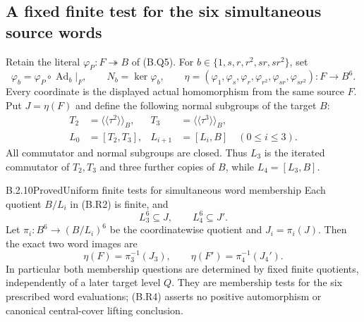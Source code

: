 \subsection{A fixed finite test for the six simultaneous source words}

Retain the literal $\varphi_P:F\twoheadrightarrow B$ of
(B.Q5).  For $b\in\{1,s,r,r^2,sr,sr^2\}$, set
\[
 \varphi_b=\varphi_P\circ\operatorname{Ad}_b|_F,
 \qquad N_b=\ker\varphi_b,
 \qquad \eta=(\varphi_1,\varphi_s,\varphi_r,
                    \varphi_{r^2},\varphi_{sr},\varphi_{sr^2})
          :F\longrightarrow B^6.                              \tag{B.R1}
\]
Every coordinate is the displayed actual homomorphism from
the same source $F$.  Put $J=\eta(F)$ and define the following
normal subgroups of the target $B$:
\[
 \begin{aligned}
 T_2&=\langle\!\langle\tau^2\rangle\!\rangle_B,&
 T_3&=\langle\!\langle\tau^3\rangle\!\rangle_B,\\
 L_0&=[T_2,T_3],& L_{i+1}&=[L_i,B]\quad(0\leq i\leq3).
 \end{aligned}                                                   \tag{B.R2}
\]
All commutator and normal subgroups are closed.  Thus $L_3$
is the iterated commutator of $T_2,T_3$ and three further
copies of $B$, while $L_4=[L_3,B]$.

\begin{result}{B.2.10}{Proved}{Uniform finite tests for simultaneous word membership}
Each quotient $B/L_i$ in (B.R2) is finite, and
\[
                       L_3^6\subseteq J,
                       \qquad L_4^6\subseteq J'.                \tag{B.R3}
\]
Let $\pi_i:B^6\to(B/L_i)^6$ be the coordinatewise quotient
and $J_i=\pi_i(J)$.  Then the exact two word images are
\[
 \eta(F)=\pi_3^{-1}(J_3),\qquad
 \eta(F')=\pi_4^{-1}(J_4').                                    \tag{B.R4}
\]
In particular both membership questions are determined by
fixed finite quotients, independently of a later target
level $Q$.  They are membership tests for the six prescribed
word evaluations; (B.R4) asserts no positive automorphism
or canonical central-cover lifting conclusion.
\end{result}


